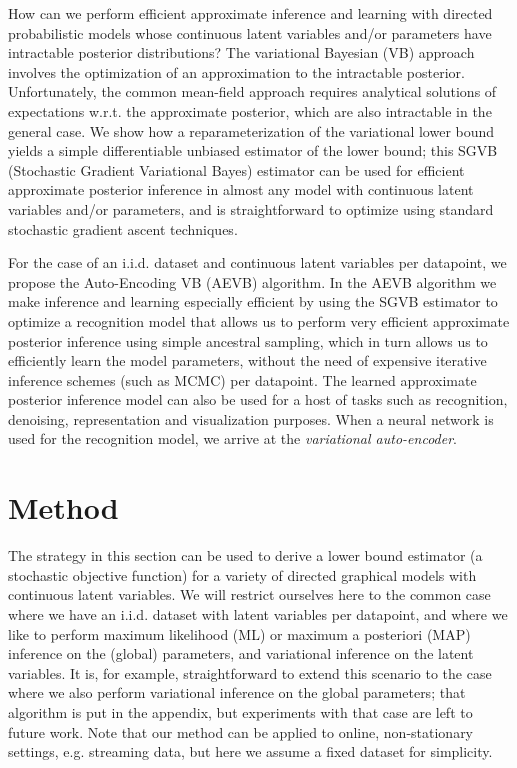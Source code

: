 \documentclass{article} %
\theoremstyle{definition}
\theoremstyle{definition}
\begin{document}
%

%
How can we perform efficient approximate inference and learning with directed probabilistic models 
whose continuous latent variables and/or parameters have intractable posterior distributions?
The variational Bayesian (VB) approach involves the optimization of an approximation to the intractable posterior. Unfortunately, the common mean-field approach requires analytical solutions of expectations w.r.t. the approximate posterior, which are also intractable in the general case. We show how a reparameterization of the variational lower bound yields a simple differentiable unbiased estimator of the lower bound; this SGVB (Stochastic Gradient Variational Bayes) estimator can be used for efficient approximate posterior inference in almost any model with continuous latent variables and/or parameters, and is straightforward to optimize using standard stochastic gradient ascent techniques.

%
For the case of an i.i.d. dataset and continuous latent variables per datapoint, we propose the Auto-Encoding VB (AEVB) algorithm. In the AEVB algorithm we make inference and learning especially efficient by using the SGVB estimator to optimize a recognition model that allows us to perform very efficient approximate posterior inference using simple ancestral sampling, which in turn allows us to efficiently learn the model parameters, without the need of expensive iterative inference schemes (such as MCMC) per datapoint. The learned approximate posterior inference model can also be used for a host of tasks such as recognition, denoising, representation and visualization purposes. When a neural network is used for the recognition model, we arrive at the \emph{variational auto-encoder}.

%
%
%
%

%

%
%

\section{Method}
\label{sec:method}

The strategy in this section can be used to derive a lower bound estimator (a stochastic objective function) for a variety of directed graphical models with continuous latent variables. We will restrict ourselves here to the common case where we have an i.i.d. dataset with latent variables per datapoint, and where we like to perform maximum likelihood (ML) or maximum a posteriori (MAP) inference on the (global) parameters, and variational inference on the latent variables. It is, for example, straightforward to extend this scenario to the case where we also perform variational inference on the global parameters; that algorithm is put in the appendix, but experiments with that case are left to future work. Note that our method can be applied to online, non-stationary settings, e.g. streaming data, but here we assume a fixed dataset for simplicity.
\end{document}
